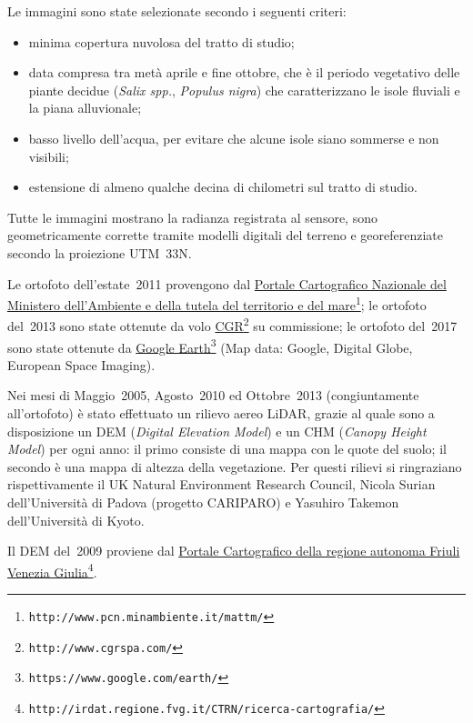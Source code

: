 %
Le immagini sono state selezionate secondo i seguenti criteri:
%
\begin{itemize}
	\item minima copertura nuvolosa del tratto di studio;
	\item data compresa tra metà aprile e fine ottobre, che è il periodo vegetativo delle piante decidue (\emph{Salix spp.}, \emph{Populus nigra}) che caratterizzano le isole fluviali e la piana alluvionale;
	\item basso livello dell'acqua, per evitare che alcune isole siano sommerse e non visibili;
	\item estensione di almeno qualche decina di chilometri sul tratto di studio.
\end{itemize}
%
Tutte le immagini mostrano la radianza registrata al sensore, sono geometricamente corrette tramite modelli digitali del terreno e georeferenziate secondo la proiezione UTM~33N.

Le ortofoto dell'estate~2011 provengono dal \href{http://www.pcn.minambiente.it/mattm/}{Portale Cartografico Nazionale del Ministero dell'Ambiente e della tutela del territorio e del mare}\footnote{\texttt{http://www.pcn.minambiente.it/mattm/}};
le ortofoto del~2013 sono state ottenute da volo \href{http://www.cgrspa.com/}{CGR}\footnote{\texttt{http://www.cgrspa.com/}} su commissione; 
le ortofoto del~2017 sono state ottenute da \href{https://www.google.com/earth/}{Google Earth}\footnote{\texttt{https://www.google.com/earth/}} (Map data: Google, Digital Globe, European Space Imaging).

Nei mesi di Maggio~2005, Agosto~2010 ed Ottobre~2013 (congiuntamente all'ortofoto) è stato effettuato un rilievo aereo LiDAR, grazie al quale sono a disposizione un DEM (\emph{Digital Elevation Model}) e un CHM (\emph{Canopy Height Model}) per ogni anno: il primo consiste di una mappa con le quote del suolo; il secondo è una mappa di altezza della vegetazione.
Per questi rilievi si ringraziano rispettivamente il UK Natural Environment Research Council, Nicola Surian dell'Università di Padova (progetto CARIPARO) e Yasuhiro Takemon dell'Università di Kyoto.

Il DEM del~2009 proviene dal \href{http://irdat.regione.fvg.it/CTRN/ricerca-cartografia/}{Portale Cartografico della regione autonoma Friuli Venezia Giulia}\footnote{\texttt{http://irdat.regione.fvg.it/CTRN/ricerca-cartografia/}}.

